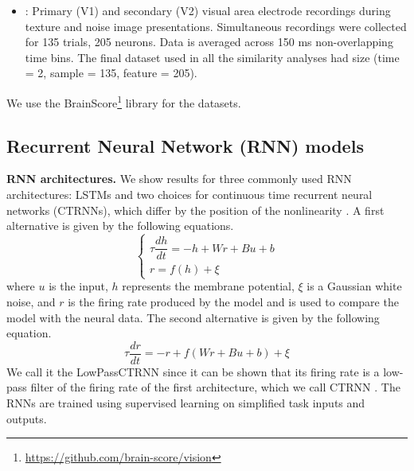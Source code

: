 \documentclass{article} %
\begin{document}
\begin{itemize}
    \item \citet{Freeman2013}: Primary (V1) and secondary (V2) visual area electrode recordings during texture and noise image presentations. Simultaneous recordings were collected for 135 trials, 205 neurons. Data is averaged across 150 ms non-overlapping time bins. The final dataset used in all the similarity analyses had size (time = 2, sample = 135, feature = 205).
\end{itemize}
We use the BrainScore\footnote{\url{https://github.com/brain-score/vision}} library \citep{Schrimpf2020integrative} for the \citet{MajajHong2015, Freeman2013} datasets.



\subsection{Recurrent Neural Network (RNN) models}
\textbf{RNN architectures.}
We show results for three commonly used RNN architectures: LSTMs \citep{HochreiterSchmidhuber1997} and two choices for continuous time recurrent neural networks (CTRNNs), which differ by the position of the nonlinearity \citep{KennethMiller2012}. A first alternative is given by the following equations.
$$
\left\{
    \begin{array}{ll}
        \tau \dfrac{dh}{dt} = -h + Wr + Bu + b\\
        r = f(h) + \xi
    \end{array}
\right.
$$
where $u$ is the input, $h$ represents the membrane potential, $\xi$ is a Gaussian white noise, and $r$ is the firing rate produced by the model and is used to compare the model with the neural data. The second alternative is given by the following equation.
$$\tau \dfrac{dr}{dt} = -r + f(Wr + Bu + b) + \xi$$
We call it the LowPassCTRNN since it can be shown that its firing rate is a low-pass filter of the firing rate of the first architecture, which we call CTRNN \citep{KennethMiller2012}. The RNNs are trained using supervised learning on simplified task inputs and outputs.\\
\end{document}
